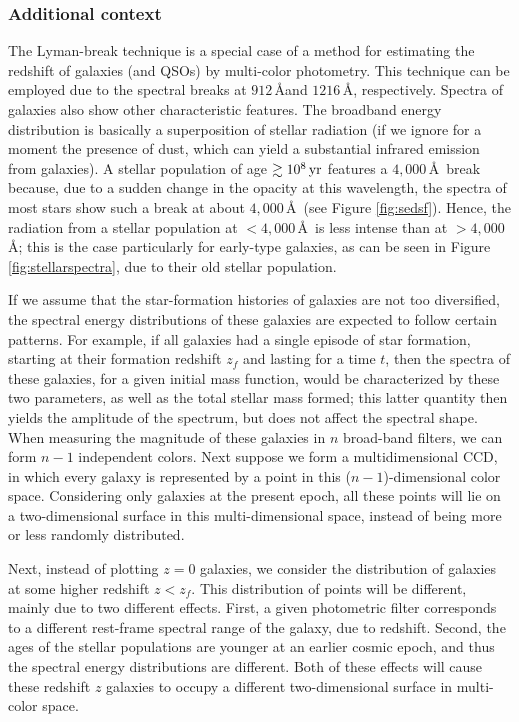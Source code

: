 \documentclass[a4paper,11pt]{article}
\begin{document}
\subsubsection{Additional context}

The Lyman-break technique is a special case of a method for estimating the redshift of galaxies (and QSOs) by multi-color photometry. This technique can be employed due to the spectral breaks at $912\,$\AA and $1216\,$\AA, respectively. Spectra of galaxies also show other characteristic features. The broadband energy distribution is basically a superposition of stellar radiation (if we ignore for a moment the presence of dust, which can yield a substantial infrared emission from galaxies). A stellar population of age $\gtrsim10^8\,{\rm yr}$ features a $4,000$\,\AA~break because, due to a sudden change in the opacity at this wavelength, the spectra of most stars show such a break at about $4,000$\,\AA~(see Figure \ref{fig:sedsf}). Hence, the radiation from a stellar population at $<4,000$\,\AA~is less intense than at $>4,000$\,\AA; this is the case particularly for early-type galaxies, as can be seen in Figure \ref{fig:stellarspectra}, due to their old stellar population.

{\noindent}If we assume that the star-formation histories of galaxies are not too diversified, the spectral energy distributions of these galaxies are expected to follow certain patterns. For example, if all galaxies had a single episode of star formation, starting at their formation redshift $z_f$ and lasting for a time $t$, then the spectra of these galaxies, for a given initial mass function, would be characterized by these two parameters, as well as the total stellar mass formed; this latter quantity then yields the amplitude of the spectrum, but does not affect the spectral shape. When measuring the magnitude of these galaxies in $n$ broad-band filters, we can form $n-1$ independent colors. Next suppose we form a multidimensional CCD, in which every galaxy is represented by a point in this ($n-1$)-dimensional color space. Considering only galaxies at the present epoch, all these points will lie on a two-dimensional surface in this multi-dimensional space, instead of being more or less randomly distributed.

{\noindent}Next, instead of plotting $z=0$ galaxies, we consider the distribution of galaxies at some higher redshift $z<z_f$. This distribution of points will be different, mainly due to two different effects. First, a given photometric filter corresponds to a different rest-frame spectral range of the galaxy, due to redshift. Second, the ages of the stellar populations are younger at an earlier cosmic epoch, and thus the spectral energy distributions are different. Both of these effects will cause these redshift $z$ galaxies to occupy a different two-dimensional surface in multi-color space.
\end{document}
